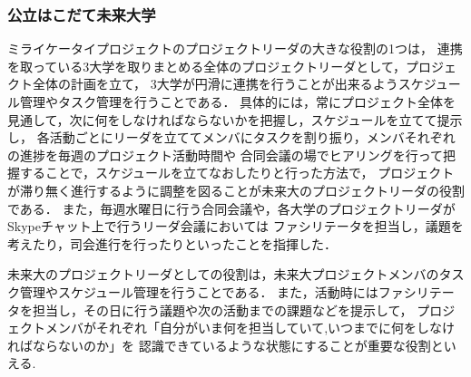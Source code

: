 \subsubsection{公立はこだて未来大学}
\par
ミライケータイプロジェクトのプロジェクトリーダの大きな役割の1つは，
連携を取っている3大学を取りまとめる全体のプロジェクトリーダとして，プロジェクト全体の計画を立て，
3大学が円滑に連携を行うことが出来るようスケジュール管理やタスク管理を行うことである．
具体的には，常にプロジェクト全体を見通して，次に何をしなければならないかを把握し，スケジュールを立てて提示し，
各活動ごとにリーダを立ててメンバにタスクを割り振り，メンバそれぞれの進捗を毎週のプロジェクト活動時間や
合同会議の場でヒアリングを行って把握することで，スケジュールを立てなおしたりと行った方法で，
プロジェクトが滞り無く進行するように調整を図ることが未来大のプロジェクトリーダの役割である．
また，毎週水曜日に行う合同会議や，各大学のプロジェクトリーダがSkypeチャット上で行うリーダ会議においては
ファシリテータを担当し，議題を考えたり，司会進行を行ったりといったことを指揮した．

未来大のプロジェクトリーダとしての役割は，未来大プロジェクトメンバのタスク管理やスケジュール管理を行うことである．
また，活動時にはファシリテータを担当し，その日に行う議題や次の活動までの課題などを提示して，
プロジェクトメンバがそれぞれ「自分がいま何を担当していて,いつまでに何をしなければならないのか」を
認識できているような状態にすることが重要な役割といえる.

